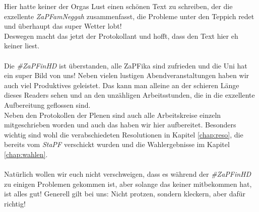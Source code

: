 
\vspace{4cm}

Hier hatte keiner der Orgas Lust einen schönen Text zu schreiben, der die exzellente \textit{ZaPFamNeggah} zusammenfasst,
die Probleme unter den Teppich redet und überhaupt das super Wetter lobt! \\
Deswegen macht das jetzt der Protokollant und hofft, dass den Text hier eh keiner liest. \\ \\

Die \textit{\#ZaPFinHD} ist überstanden, alle ZaPFika sind zufrieden und die Uni hat ein super Bild von uns! 
Neben vielen lustigen Abendveranstaltungen haben wir auch viel Produktives geleistet. Das kann man alleine an der schieren Länge dieses Readers sehen und an den unzähligen Arbeitsstunden, die in die exzellente Aufbereitung geflossen sind. \\
Neben den Protokollen der Plenen sind auch alle Arbeitskreise einzeln mitgeschrieben worden und auch das haben wir hier aufbereitet. Besonders wichtig sind wohl die verabschiedeten Resolutionen in Kapitel \ref{chap:reso}, die bereits vom \textit{StaPF} verschickt wurden und die Wahlergebnisse im Kapitel \ref{chap:wahlen}. \\ \\

Natürlich wollen wir euch nicht verschweigen, dass es während der \textit{\#ZaPFinHD} zu einigen Problemen gekommen ist, aber solange das keiner mitbekommen hat, ist alles gut! Generell gilt bei uns: Nicht protzen, sondern kleckern, aber dafür richtig!
